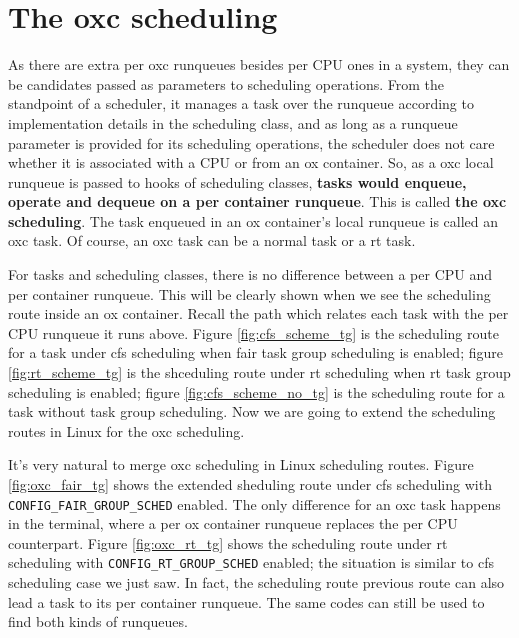 \section{The oxc scheduling\label{sec:design_oxc_scheduling}}
As there are extra per oxc runqueues besides 
per CPU ones in a system, they can be candidates passed as parameters to 
scheduling operations. From the standpoint of a scheduler, it manages a task 
over the runqueue according to implementation details in the scheduling class, 
and as long as a runqueue parameter is provided for its scheduling operations, 
the scheduler does not care whether it is associated with a CPU or from an ox 
container. So, as a oxc local runqueue is passed to hooks of scheduling 
classes, \textbf{tasks would enqueue, operate and dequeue on a per container 
runqueue}. This is called \textbf{the oxc scheduling}. The task enqueued in
an ox container's local runqueue is called an oxc task. Of course, an oxc 
task can be a normal task or a rt task.

For tasks and scheduling classes, there is no difference between a per CPU 
and per container runqueue. This will be clearly shown when we see the 
scheduling route inside an ox container. 
Recall the path which relates each task with the per CPU runqueue it runs above.
Figure \ref{fig:cfs_scheme_tg} is the scheduling route for a task under 
cfs scheduling when fair task group scheduling is enabled; figure 
\ref{fig:rt_scheme_tg} is the shceduling route under rt scheduling when rt task 
group scheduling is enabled; figure \ref{fig:cfs_scheme_no_tg} is the 
scheduling route for a task without task group scheduling.
Now we are going to extend the scheduling routes in Linux for the oxc scheduling. 

It's very natural to merge oxc scheduling in Linux scheduling routes.
Figure \ref{fig:oxc_fair_tg} shows the extended sheduling route under cfs
scheduling with \texttt{CONFIG\_FAIR\_GROUP\_SCHED} enabled. The only
difference for an oxc task happens in the terminal, where a per ox container
runqueue replaces the per CPU counterpart. Figure \ref{fig:oxc_rt_tg} shows
the scheduling route under rt scheduling with \texttt{CONFIG\_RT\_GROUP\_SCHED}
enabled; the situation is similar to cfs scheduling case we just saw.
In fact, the scheduling route previous route can also lead a task to its per 
container runqueue. The same codes can still be used to find both kinds of 
runqueues.

